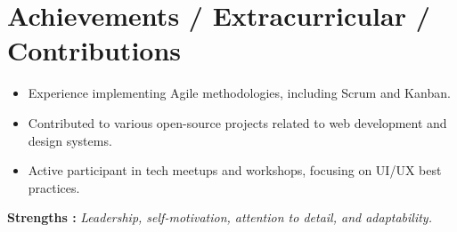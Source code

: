 \documentclass[letterpaper,11pt]{article}
\newcommand{\resumeItem}[1]{
  \item\small{
    {#1 \vspace{-2pt}}
  }
}
\newcommand{\resumeSubHeadingListStart}{\begin{itemize}[leftmargin=0.0in, label={}]}
\newcommand{\resumeSubHeadingListEnd}{\end{itemize}}
\newcommand{\resumeItemListStart}{\begin{itemize}}
\newcommand{\resumeItemListEnd}{\end{itemize}\vspace{-5pt}}
\begin{document}
\section{Achievements / Extracurricular / Contributions}
\resumeSubHeadingListStart
\resumeItemListStart
\resumeItem{Experience implementing Agile methodologies, including Scrum and Kanban.}
\resumeItem{Contributed to various open-source projects related to web development and design systems.}
\resumeItem{Active participant in tech meetups and workshops, focusing on UI/UX best practices.}
\resumeItemListEnd

\resumeSubHeadingListEnd
\textbf{Strengths : }\emph{Leadership, self-motivation, attention to detail, and adaptability.} \\

\vspace{10pt}
\end{document}
